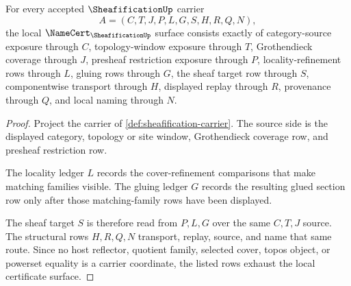 \begin{theorem}
\label{thm:sheafification-namecert-obligations}
For every accepted $\SheafificationUp$ carrier
$$
A=(C,T,J,P,L,G,S,H,R,Q,N),
$$
the local $\NameCert_{\SheafificationUp}$ surface consists exactly of category-source exposure through $C$, topology-window exposure through $T$, Grothendieck coverage through $J$, presheaf restriction exposure through $P$, locality-refinement rows through $L$, gluing rows through $G$, the sheaf target row through $S$, componentwise transport through $H$, displayed replay through $R$, provenance through $Q$, and local naming through $N$.
\end{theorem}
\begin{proof}
Project the carrier of \autoref{def:sheafification-carrier}. The source side is the displayed category, topology or site window, Grothendieck coverage row, and presheaf restriction row.

The locality ledger $L$ records the cover-refinement comparisons that make matching families visible. The gluing ledger $G$ records the resulting glued section row only after those matching-family rows have been displayed.

The sheaf target $S$ is therefore read from $P,L,G$ over the same $C,T,J$ source. The structural rows $H,R,Q,N$ transport, replay, source, and name that same route. Since no host reflector, quotient family, selected cover, topos object, or powerset equality is a carrier coordinate, the listed rows exhaust the local certificate surface.
\end{proof}

